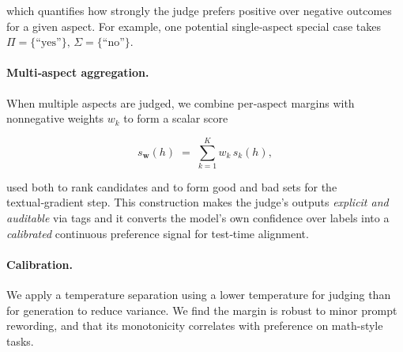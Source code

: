 \documentclass[11pt]{article}
\theoremstyle{plain}
\theoremstyle{definition}
\theoremstyle{remark}
\begin{document}
which quantifies how strongly the judge prefers positive over negative outcomes for a given aspect. For example, one potential single‑aspect special case takes \(\Pi=\{\text{``yes''}\},\,\Sigma=\{\text{``no''}\}\).

\paragraph{Multi‑aspect aggregation.} When multiple aspects are judged, we combine per‑aspect margins with nonnegative weights \(w_k\) to form a scalar score

\begin{equation}
  s_{\mathbf{w}}(h)\;=\;\sum_{k=1}^{K} w_k\, s_k(h),
\end{equation}

used both to rank candidates and to form good and bad sets for the textual‑gradient step. This construction makes the judge’s outputs \emph{explicit and auditable} via tags and it converts the model’s own confidence over labels into a \emph{calibrated} continuous preference signal for test‑time alignment.

\paragraph{Calibration.} We apply a temperature separation using a lower temperature for judging than for generation to reduce variance. We find the margin is robust to minor prompt rewording, and that its monotonicity correlates with preference on math-style tasks.

\end{document}
